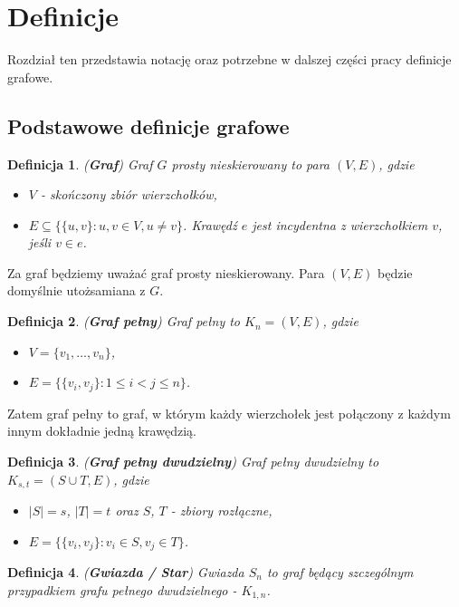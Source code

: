 \documentclass[letterpaper,12pt]{article}
\newtheorem{definition}{Definicja}
\begin{document}
\section{Definicje}
Rozdział ten przedstawia notację oraz potrzebne w dalszej części pracy definicje grafowe.
\subsection{Podstawowe definicje grafowe}
\begin{definition}
  (\textbf{Graf}) Graf \(G\) prosty nieskierowany to para \((V, E)\), gdzie
  \begin{itemize}
    \item \(V\) - skończony zbiór wierzchołków,
    \item \(E \subseteq \{\{u,v\}: u,v \in V, u \neq v\}\). Krawędź \(e\) jest incydentna z wierzchołkiem \(v\), jeśli \(v \in e\).
  \end{itemize}
\end{definition}
Za graf będziemy uważać graf prosty nieskierowany. Para \((V, E)\) będzie domyślnie utożsamiana z \(G\).\\

\begin{definition}
  (\textbf{Graf pełny}) Graf pełny to \(K_n = (V,E)\), gdzie
  \begin{itemize}
    \item \(V = \{v_1, \ldots, v_n\}\),
    \item \(E = \{\{v_i, v_j\} : 1 \leq i < j \leq n\}\).
  \end{itemize}
\end{definition}
Zatem graf pełny to graf, w którym każdy wierzchołek jest połączony z każdym innym dokładnie jedną krawędzią.\\

\begin{definition}
  (\textbf{Graf pełny dwudzielny}) Graf pełny dwudzielny to \(K_{s,t} = (S \cup T,E)\), gdzie
  \begin{itemize}
    \item \(|S|=s\), \(|T|=t\) oraz \(S\), \(T\) - zbiory rozłączne,
    \item \(E = \{\{v_i, v_j\} : v_i \in S, v_j \in T\}\).\\
  \end{itemize}
\end{definition}

\begin{definition}
  (\textbf{Gwiazda / Star}) Gwiazda \(S_n\) to graf będący szczególnym przypadkiem grafu pełnego dwudzielnego - \(K_{1,n}\).\\
\end{definition}
\end{document}
